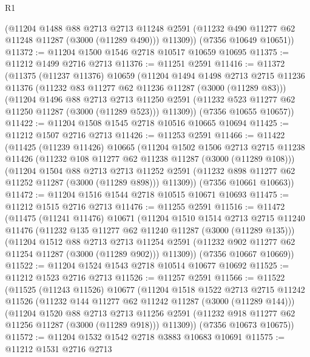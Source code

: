 \begin{lexlean}{R1}
\begin{coremodule}
        (@11204
          @1488
          @88
          @2713
          @2713
          @11248
          @2591
          (@11232 @490 @11277 @62 @11248 @11287 (@3000 (@11289 @490)))
          @11309))
      (@7356 @10649 @10651))
@11372 := @11204 @1500 @1546 @2718 @10517 @10659 @10695
@11375 := @11212 @1499 @2716 @2713
@11376 := @11251 @2591
@11416 := @11372
    (@11375
      (@11237 @11376)
      @10659
      (@11204
        @1494
        @1498
        @2713
        @2715
        @11236
        @11376
        (@11232 @83 @11277 @62 @11236 @11287 (@3000 (@11289 @83)))
        (@11204
          @1496
          @88
          @2713
          @2713
          @11250
          @2591
          (@11232 @523 @11277 @62 @11250 @11287 (@3000 (@11289 @523)))
          @11309))
      (@7356 @10655 @10657))
@11422 := @11204 @1508 @1545 @2718 @10516 @10665 @10694
@11425 := @11212 @1507 @2716 @2713
@11426 := @11253 @2591
@11466 := @11422
    (@11425
      (@11239 @11426)
      @10665
      (@11204
        @1502
        @1506
        @2713
        @2715
        @11238
        @11426
        (@11232 @108 @11277 @62 @11238 @11287 (@3000 (@11289 @108)))
        (@11204
          @1504
          @88
          @2713
          @2713
          @11252
          @2591
          (@11232 @898 @11277 @62 @11252 @11287 (@3000 (@11289 @898)))
          @11309))
      (@7356 @10661 @10663))
@11472 := @11204 @1516 @1544 @2718 @10515 @10671 @10693
@11475 := @11212 @1515 @2716 @2713
@11476 := @11255 @2591
@11516 := @11472
    (@11475
      (@11241 @11476)
      @10671
      (@11204
        @1510
        @1514
        @2713
        @2715
        @11240
        @11476
        (@11232 @135 @11277 @62 @11240 @11287 (@3000 (@11289 @135)))
        (@11204
          @1512
          @88
          @2713
          @2713
          @11254
          @2591
          (@11232 @902 @11277 @62 @11254 @11287 (@3000 (@11289 @902)))
          @11309))
      (@7356 @10667 @10669))
@11522 := @11204 @1524 @1543 @2718 @10514 @10677 @10692
@11525 := @11212 @1523 @2716 @2713
@11526 := @11257 @2591
@11566 := @11522
    (@11525
      (@11243 @11526)
      @10677
      (@11204
        @1518
        @1522
        @2713
        @2715
        @11242
        @11526
        (@11232 @144 @11277 @62 @11242 @11287 (@3000 (@11289 @144)))
        (@11204
          @1520
          @88
          @2713
          @2713
          @11256
          @2591
          (@11232 @918 @11277 @62 @11256 @11287 (@3000 (@11289 @918)))
          @11309))
      (@7356 @10673 @10675))
@11572 := @11204 @1532 @1542 @2718 @3883 @10683 @10691
@11575 := @11212 @1531 @2716 @2713

\end{coremodule}
\end{lexlean}
